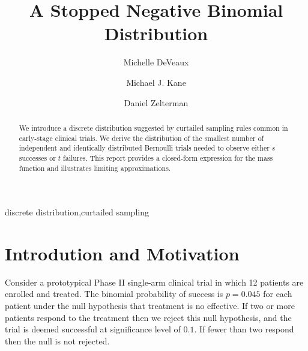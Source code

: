 \documentclass[review]{elsarticle}
\begin{document}
\begin{frontmatter}

\title{A Stopped Negative Binomial Distribution}


\author[mymainaddress]{Michelle DeVeaux}

\author[mymainaddress]{Michael J. Kane}

\author[mymainaddress]{Daniel Zelterman}

\address[mymainaddress]{Department of Biostatistics\\ School of Epidemiology and Public Health\\ Yale University, New Haven, CT}

\begin{abstract}
We introduce a discrete distribution suggested by curtailed
sampling rules common in early-stage clinical trials. We derive the
distribution of the smallest number of independent and identically
distributed Bernoulli trials needed to observe either $s$ successes 
or $t$ failures. This report provides a closed-form expression for the 
mass function and illustrates limiting approximations.
\end{abstract}

\begin{keyword}
discrete distribution\sep curtailed sampling
\end{keyword}

\end{frontmatter}

\linenumbers

\section{Introdution and Motivation}

Consider a prototypical Phase II single-arm clinical trial in which 12 patients
are enrolled and treated. The binomial probability of success is $p=0.045$ for
each patient under the null hypothesis that treatment is no effective.
If two or more patients respond to the treatment then we reject this null
hypothesis, and the trial is deemed successful at significance level of $0.1$. 
If fewer than two respond then the null is not rejected.
\end{document}
